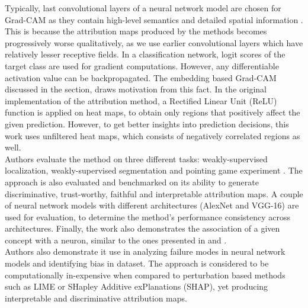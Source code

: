 \documentclass[../report.tex]{subfiles}
\begin{document}
	Typically, last convolutional layers of a neural network model are chosen for Grad-CAM as they contain high-level semantics and detailed spatial information \cite{selvaraju2017grad}. This is because the attribution maps produced by the methods becomes progressively worse qualitatively,  as we use earlier convolutional layers which have relatively lesser receptive fields. In a classification network, logit scores of the target class are used for gradient computations. However, any differentiable activation value can be backpropagated. The embedding based Grad-CAM discussed in the section, draws motivation from this fact. In the original implementation of the attribution method, a Rectified Linear Unit (ReLU) function is applied on heat maps, to obtain only regions that positively affect the given prediction. However, to get better insights into prediction decisions, this work uses unfiltered heat maps, which consists of negatively correlated regions as well.\\  
   Authors evaluate the method on three different tasks: weakly-supervised localization, weakly-supervised segmentation and pointing game experiment \cite{zhang2018top}. The approach is also evaluated and benchmarked on its ability to generate discriminative, trust-worthy, faithful and interpretable attribution maps. A couple of neural network models with different architectures (AlexNet \cite{krizhevsky2012imagenet} and VGG-16) are used for evaluation, to determine the method’s performance consistency across architectures.
   Finally, the work also demonstrates the association of a given concept with a neuron, similar to the ones presented in \cite{matthew2014visualizing} and \cite{zhou2014object}.\\
	Authors also demonstrate it use in analyzing failure modes in neural network models and identifying bias in dataset.
	The approach is considered to be computationally in-expensive when compared to perturbation based methods such as LIME or SHapley Additive exPlanations (SHAP)\cite{shap}, yet producing interpretable and discriminative attribution maps.
	
\end{document}
